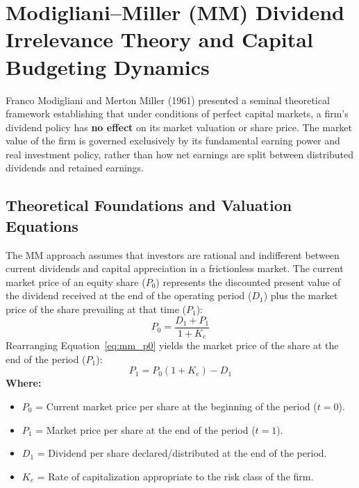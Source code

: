 \section{Modigliani--Miller (MM) Dividend Irrelevance Theory and Capital Budgeting Dynamics}

Franco Modigliani and Merton Miller (1961) presented a seminal theoretical framework establishing that under conditions of perfect capital markets, a firm's dividend policy has \textbf{no effect} on its market valuation or share price. The market value of the firm is governed exclusively by its fundamental earning power and real investment policy, rather than how net earnings are split between distributed dividends and retained earnings.

\subsection{Theoretical Foundations and Valuation Equations}
The MM approach assumes that investors are rational and indifferent between current dividends and capital appreciation in a frictionless market. The current market price of an equity share ($P_0$) represents the discounted present value of the dividend received at the end of the operating period ($D_1$) plus the market price of the share prevailing at that time ($P_1$):
\begin{equation}
    P_0 = \frac{D_1 + P_1}{1 + K_e}
    \label{eq:mm_p0}
\end{equation}
Rearranging Equation~\eqref{eq:mm_p0} yields the market price of the share at the end of the period ($P_1$):
\begin{equation}
    P_1 = P_0 (1 + K_e) - D_1
    \label{eq:mm_p1}
\end{equation}
\textbf{Where:}
\begin{itemize}[noitemsep, topsep=2pt]
    \item $P_0$ = Current market price per share at the beginning of the period ($t=0$).
    \item $P_1$ = Market price per share at the end of the period ($t=1$).
    \item $D_1$ = Dividend per share declared/distributed at the end of the period.
    \item $K_e$ = Rate of capitalization appropriate to the risk class of the firm.
\end{itemize}

